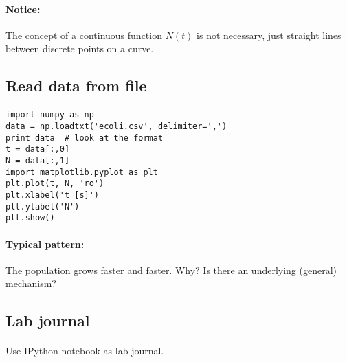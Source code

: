 \documentclass[%
twoside,                 %
final,                   %
10pt]{article}
\begin{document}
\noindent




\paragraph{Notice:}
The concept of a continuous function $N(t)$ is not necessary,
just straight lines between discrete points on a curve.



\subsection*{Read data from file}


\paragraph{}
\begin{verbatim}
import numpy as np
data = np.loadtxt('ecoli.csv', delimiter=',')
print data  # look at the format
t = data[:,0]
N = data[:,1]
import matplotlib.pyplot as plt
plt.plot(t, N, 'ro')
plt.xlabel('t [s]')
plt.ylabel('N')
plt.show()
\end{verbatim}




\paragraph{Typical pattern:}
The population grows faster and faster. Why? Is there an
underlying (general) mechanism?



\subsection*{Lab journal}


\paragraph{}
Use IPython notebook as lab journal.




\end{document}
